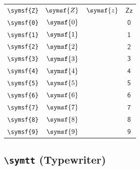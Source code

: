 \documentclass[12pt,a4paper]{article}
\begin{document}
\begin{longtable}{|c|c|c|c|}
\verb|\symsf{Z}| & $\symsf{Z}$ & $\symsf{z}$ & $ 𝖹 𝗓 $ \\
\verb|\symsf{0}| & $\symsf{0}$ & & $ 𝟢 $ \\
\verb|\symsf{1}| & $\symsf{1}$ & & $ 𝟣 $ \\
\verb|\symsf{2}| & $\symsf{2}$ & & $ 𝟤 $ \\
\verb|\symsf{3}| & $\symsf{3}$ & & $ 𝟥 $ \\
\verb|\symsf{4}| & $\symsf{4}$ & & $ 𝟦 $ \\
\verb|\symsf{5}| & $\symsf{5}$ & & $ 𝟧 $ \\
\verb|\symsf{6}| & $\symsf{6}$ & & $ 𝟨 $ \\
\verb|\symsf{7}| & $\symsf{7}$ & & $ 𝟩 $ \\
\verb|\symsf{8}| & $\symsf{8}$ & & $ 𝟪 $ \\
\verb|\symsf{9}| & $\symsf{9}$ & & $ 𝟫 $ \\
\hline
\end{longtable}

\newpage

\subsection*{\texttt{\textbackslash{}symtt} (Typewriter)}
\end{document}
